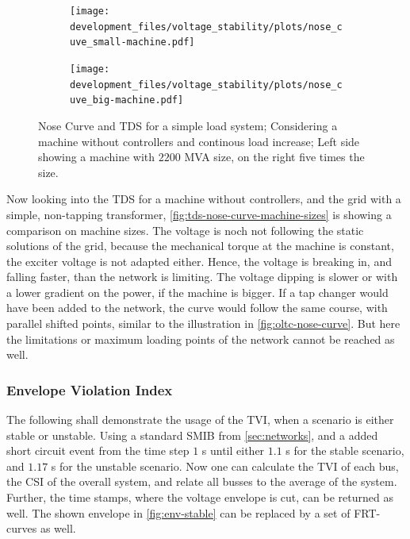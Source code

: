 \begin{figure}[htbp!]
    \centering
    \begin{subfigure}[b]{.49\linewidth}
        \centering
        \texttt{[image: development\_files/voltage\_stability/plots/nose\_cuve\_small-machine.pdf]}
    \end{subfigure}
    \begin{subfigure}[b]{.49\linewidth}
        \centering
        \texttt{[image: development\_files/voltage\_stability/plots/nose\_cuve\_big-machine.pdf]}
    \end{subfigure}
    \caption[Nose Curve and \acs{TDS} for a simple load system without machine controllers]{Nose Curve and \acs{TDS} for a simple load system; Considering a machine without controllers and continous load increase; Left side showing a machine with $2200$ MVA size, on the right five times the size.}
    \label{fig:tds-nose-curve-machine-sizes}
\end{figure}

Now looking into the \acs{TDS} for a machine without controllers, and the grid with a simple, non-tapping transformer, \autoref{fig:tds-nose-curve-machine-sizes} is showing a comparison on machine sizes.
The voltage is noch not following the static solutions of the grid, because the mechanical torque at the machine is constant, the exciter voltage is not adapted either.
Hence, the voltage is breaking in, and falling faster, than the network is limiting.
The voltage dipping is slower or with a lower gradient on the power, if the machine is bigger.
If a tap changer would have been added to the network, the curve would follow the same course, with parallel shifted points, similar to the illustration in \autoref{fig:oltc-nose-curve}.
But here the limitations or maximum loading points of the network cannot be reached as well.

\subsubsection{Envelope Violation Index}

The following shall demonstrate the usage of the \acf{TVI}, when a scenario is either stable or unstable.
Using a standard \acs{SMIB} from \autoref{sec:networks}, and a added short circuit event from the time step $1$ s until either $1.1$ s for the stable scenario, and $1.17$ s for the unstable scenario.
Now one can calculate the \acs{TVI} of each bus, the \acs{CSI} of the overall system, and relate all busses to the average of the system.
Further, the time stamps, where the voltage envelope is cut, can be returned as well. 
The shown envelope in \autoref{fig:env-stable} can be replaced by a set of \acs{FRT}-curves as well.

